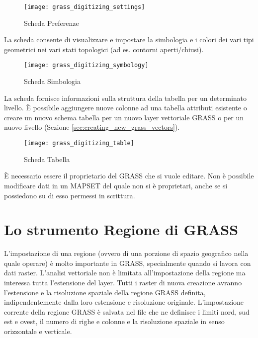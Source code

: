 \begin{figure}[h]
 \centering
 \texttt{[image: grass\_digitizing\_settings]}
 \caption{Scheda Preferenze \nixcaption}\label{fig:grass_digitizing_settings}
\end{figure}


La scheda  consente di visualizzare e impostare la
simbologia e i colori dei vari tipi geometrici nei vari stati topologici (ad
es. contorni aperti/chiusi).

\begin{figure}[h]
 \centering
 \texttt{[image: grass\_digitizing\_symbology]}
 \caption{Scheda Simbologia \nixcaption}\label{fig:grass_digitizing_symbology}
\end{figure}

 

La scheda  fornisce informazioni sulla struttura della tabella
per un determinato livello. È possibile aggiungere nuove
colonne ad una tabella attributi esistente o creare un nuovo schema tabella
per un nuovo layer vettoriale GRASS o per un nuovo livello (Sezione \ref{sec:creating_new_grass_vectors}).

\begin{figure}[h]
 \centering
 \texttt{[image: grass\_digitizing\_table]}
 \caption{Scheda Tabella \nixcaption}\label{fig:grass_digitizing_table}
 \end{figure}

\begin{Tip}\caption{\textsc{Permessi di modifica in GRASS}}
È necessario essere il proprietario del  GRASS che
si vuole editare. Non è possibile modificare dati in un {MAPSET} del quale non
si è proprietari, anche se si possiedono su di esso permessi in scrittura.
\end{Tip} 

\section{Lo strumento Regione di GRASS}\label{sec:grass_region}

L'impostazione di una regione (ovvero di una porzione di spazio geografico
nella quale operare) è molto importante in GRASS, specialmente quando si lavora con dati
raster. L'analisi vettoriale non è limitata
all'impostazione della regione ma interessa tutta l'estensione del
layer. Tutti i raster di nuova creazione avranno l'estensione e la risoluzione
spaziale della regione GRASS definita, indipendentemente dalla loro estensione
e risoluzione originale. L'impostazione corrente della regione GRASS è salvata
nel file  che ne definisce i limiti nord, sud
est e ovest, il numero di righe e colonne e la risoluzione spaziale in senso
orizzontale e verticale.

